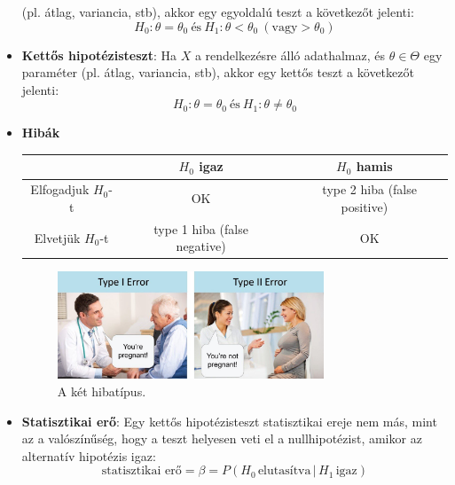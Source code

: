 \documentclass[12pt]{article}
\theoremstyle{plain}
\begin{document}
\begin{itemize}
    (pl. átlag, variancia, stb), akkor egy egyoldalú teszt a következőt jelenti:
    \begin{equation*}
        H_0: \theta = \theta_0 ~\text{és}~ H_1: \theta < \theta_0 ~ (\text{vagy} > \theta_0) 
    \end{equation*}
    \item \textbf{Kettős hipotézisteszt}: Ha $X$ a rendelkezésre álló adathalmaz, és $\theta\in \Theta$ egy paraméter 
    (pl. átlag, variancia, stb), akkor egy kettős teszt a következőt jelenti:
    \begin{equation*}
        H_0: \theta = \theta_0 ~\text{és}~ H_1: \theta \neq\theta_0 
    \end{equation*}
    \item \textbf{Hibák}
    \begin{center}
        \begin{tabular}[H]{|c|c|c|} \hline
                            &        $H_0$ igaz        & $H_0$ hamis \\ \hline
        Elfogadjuk $H_0$-t  &      OK   &   type 2 hiba (false positive)  \\ \hline
        Elvetjük $H_0$-t    & type 1 hiba (false negative)  &      OK     \\ \hline
        \end{tabular}
    \end{center}
    \begin{figure}[H]
        \begin{center}
        \includegraphics[width=0.75\textwidth]{media/typeoferrs.png}
        \caption{A két hibatípus.} 
        \label{fig:typeoferrs}
        \end{center}
    \end{figure}
    \item \textbf{Statisztikai erő}: Egy kettős hipotézisteszt statisztikai ereje nem más, mint az a valószínűség,
    hogy a teszt helyesen veti el a nullhipotézist, amikor az alternatív hipotézis igaz:
    \begin{equation*}
        \text{statisztikai erő} = \beta = P(H_0 \,\text{elutasítva} \,|\, H_1 \,\text{igaz})

\end{equation*}
\end{itemize}
\end{document}
